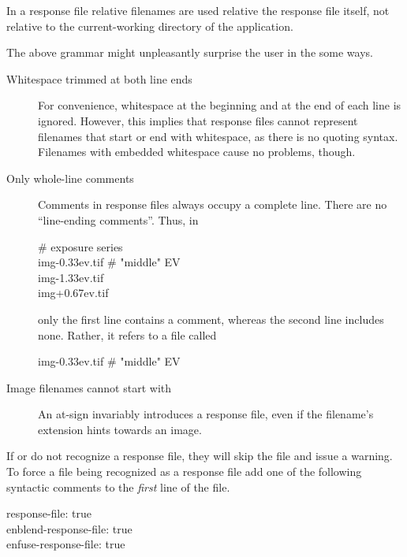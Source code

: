 In a response file relative filenames are used relative the response
file itself, not relative to the current-working directory of the
application.

The above grammar might unpleasantly surprise the user in the
some ways.

\begin{description}
\item[Whitespace trimmed at both line ends]\itemend For convenience,
  whitespace at the beginning and at the end of each line is ignored.
  However, this implies that response files cannot represent filenames
  that start or end with whitespace, as there is no quoting syntax.
  Filenames with embedded whitespace cause no problems, though.

\item[Only whole-line comments]\itemend Comments in response files
  always occupy a complete line.  There are no ``line-ending
  comments''.  Thus, in

  \begin{literal}
    \# exposure series \\
    img-0.33ev.tif \# "middle" EV \\
    img-1.33ev.tif \\
    img+0.67ev.tif \\
  \end{literal}

  only the first line contains a comment, whereas the second line
  includes none.  Rather, it refers to a file called
  \begin{literal}
    img-0.33ev.tif \# "middle" EV
  \end{literal}

\item[Image filenames cannot start with \sample{\atsign}]\itemend An
  at-sign invariably introduces a response file, even if the
  filename's extension hints towards an image.
\end{description}

If  or  do not recognize a
response file, they will skip the file and issue a warning.  To
force a file being
recognized as a response file add one of the following syntactic
comments to the \emph{first} line of the file.

\begin{literal}
  response-file: true \\
  enblend-response-file: true \\
  enfuse-response-file: true \\
\end{literal}

